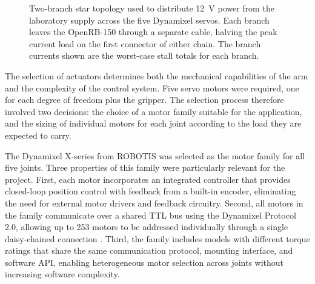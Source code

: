 \begin{figure}[H]
    \caption[Two-branch star topology for distributing 12\,V power across five Dynamixel servos.]{Two-branch star topology used to distribute 12~V power 
    from the laboratory supply across the five Dynamixel servos. Each 
    branch leaves the OpenRB-150 through a separate cable, halving 
    the peak current load on the first connector of either chain. The 
    branch currents shown are the worst-case stall totals for each 
    branch.}
    \label{fig:power_topology}
\end{figure}


The selection of actuators determines both the mechanical 
capabilities of the arm and the complexity of the control system. 
Five servo motors were required, one for each degree of freedom 
plus the gripper. The selection process therefore involved two 
decisions: the choice of a motor family suitable for the 
application, and the sizing of individual motors for each joint 
according to the load they are expected to carry.

The Dynamixel X-series from ROBOTIS was selected as the motor 
family for all five joints. Three properties of this family were 
particularly relevant for the project. First, each motor 
incorporates an integrated controller that provides closed-loop 
position control with feedback from a built-in encoder, eliminating 
the need for external motor drivers and feedback circuitry. Second, 
all motors in the family communicate over a shared TTL bus using 
the Dynamixel Protocol 2.0, allowing up to 253 motors to be 
addressed individually through a single daisy-chained connection 
\cite{robotis_dynamixel}. Third, the family includes models with 
different torque ratings that share the same communication 
protocol, mounting interface, and software API, enabling 
heterogeneous motor selection across joints without increasing 
software complexity.

